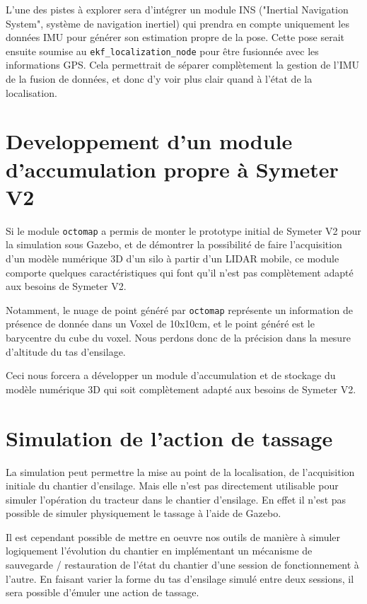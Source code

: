 \documentclass[12pt,a4paper]{report}
\begin{document}
\para L'une des pistes à explorer sera d'intégrer un module INS ("Inertial Navigation System", système de navigation inertiel) qui prendra en compte uniquement les données IMU pour générer son estimation propre de la pose. Cette pose serait ensuite soumise au \verb|ekf_localization_node| pour être fusionnée avec les informations GPS. Cela permettrait de séparer complètement la gestion de l'IMU de la fusion de données, et donc d'y voir plus clair quand à l'état de la localisation.

\section{Developpement d'un module d'accumulation propre à Symeter V2} 
Si le module \verb|octomap| a permis de monter le prototype initial de Symeter V2 pour la simulation sous Gazebo, et de démontrer la possibilité de faire l'acquisition d'un modèle numérique 3D d'un silo à partir d'un LIDAR mobile, ce module comporte quelques caractéristiques qui font qu'il n'est pas complètement adapté aux besoins de Symeter V2.

\para Notamment, le nuage de point généré par \verb|octomap| représente un information de présence de donnée dans un Voxel de 10x10cm, et le point généré est le barycentre du cube du voxel. Nous perdons donc de la précision dans la mesure d'altitude du tas d'ensilage.

\para Ceci nous forcera a développer un module d'accumulation et de stockage du modèle numérique 3D qui soit complètement adapté aux besoins de Symeter V2. 


\section{Simulation de l'action de tassage}
La simulation peut permettre la mise au point de la localisation, de l'acquisition initiale du chantier d'ensilage. Mais elle n'est pas directement utilisable pour simuler l'opération du tracteur dans le chantier d'ensilage. En effet il n'est pas possible de simuler physiquement le tassage à l'aide de Gazebo.

\para Il est cependant possible de mettre en oeuvre nos outils de manière à simuler logiquement l'évolution du chantier en implémentant un mécanisme de sauvegarde / restauration de l'état du chantier d'une session de fonctionnement à l'autre. En faisant varier la forme du tas d'ensilage simulé entre deux sessions, il sera possible d'émuler une action de tassage.
\end{document}
